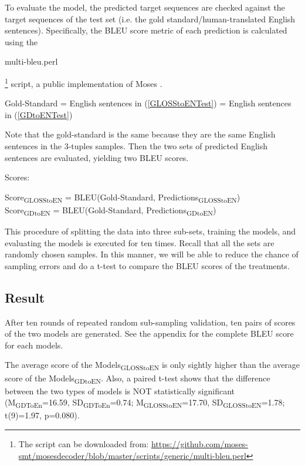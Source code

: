 \documentclass[a4paper]{article}
\begin{document}
To evaluate the model, the predicted target sequences are checked against the target sequences of the test set (i.e. the gold standard/human-translated English sentences).
Specifically, the BLEU score metric \citep{bleu} of each prediction is calculated using the \begin{myfont} multi-bleu.perl\end{myfont}\footnote{The script can be downloaded from: \url{https://github.com/moses-smt/mosesdecoder/blob/master/scripts/generic/multi-bleu.perl}}
script, a public implementation of Moses \citep{moses}. 
\begin{exe}
\ex Gold-Standard = English sentences in (\ref{GLOSStoENTest}) = English sentences in (\ref{GDtoENTest})
\end{exe}
Note that the gold-standard is the same because they are the same English sentences in the 3-tuples samples. Then the two sets of predicted English sentences are evaluated, yielding two BLEU scores.  

\begin{exe}
\ex Scores: \\
 \begin{xlist}
	\ex Score\textsubscript{GLOSStoEN} = BLEU(Gold-Standard, Predictions\textsubscript{GLOSStoEN}) \\
	\ex Score\textsubscript{GDtoEN} = BLEU(Gold-Standard, Predictions\textsubscript{GDtoEN}) \\
 \end{xlist}
\end{exe}
This procedure of splitting the data into three sub-sets, training the models, and evaluating the models is executed for ten times. Recall that all the sets are randomly chosen samples. In this manner, we will be able to reduce the chance of sampling errors and do a t-test to compare the BLEU scores of the treatments.  

\subsection{Result} \label{gdglen_results}
After ten rounds of repeated random sub-sampling validation, ten pairs of scores of the two models are generated. See the appendix for the complete BLEU score for each models.

The average score of the Models\textsubscript{GLOSStoEN} is only sightly higher than the average score of the Models\textsubscript{GDtoEN}.
Also, a paired t-test shows that the difference between the two types of models is NOT statistically significant
(M\textsubscript{GDToEn}=16.59, SD\textsubscript{GDToEn}=0.74; M\textsubscript{GLOSStoEN}=17.70, SD\textsubscript{GLOSStoEN}=1.78; t(9)=1.97, p=0.080). 
\end{document}

